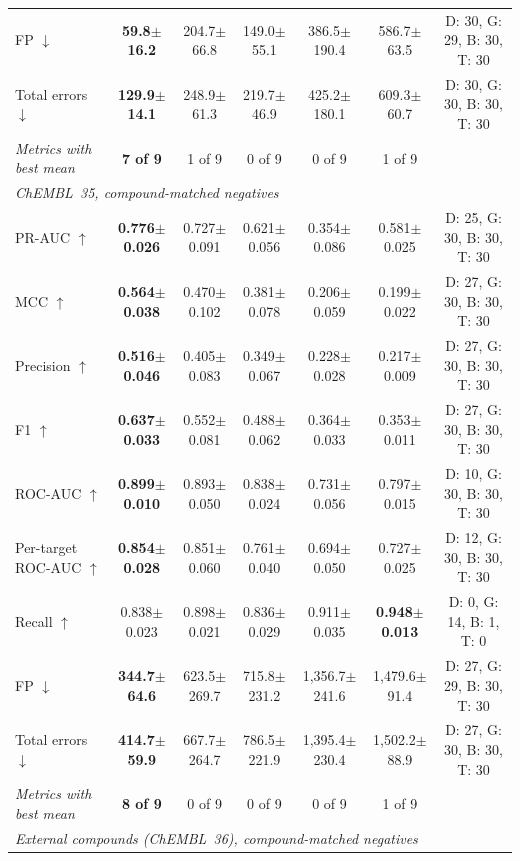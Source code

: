 \documentclass[11pt,letterpaper]{article}
\begin{document}
\begin{table}[!t]
{\begin{tabular}{l c c c c c c}
FP $\downarrow$ & \textbf{59.8$\pm$16.2} & 204.7$\pm$66.8 & 149.0$\pm$55.1 & 386.5$\pm$190.4 & 586.7$\pm$63.5 & D: 30, G: 29, B: 30, T: 30 \\
Total errors $\downarrow$ & \textbf{129.9$\pm$14.1} & 248.9$\pm$61.3 & 219.7$\pm$46.9 & 425.2$\pm$180.1 & 609.3$\pm$60.7 & D: 30, G: 30, B: 30, T: 30 \\
\textit{Metrics with best mean} & \textbf{7 of 9} & 1 of 9 & 0 of 9 & 0 of 9 & 1 of 9 & \\
\midrule
\multicolumn{7}{l}{\textit{ChEMBL~35, compound-matched negatives}} \\
PR-AUC $\uparrow$ & \textbf{0.776$\pm$0.026} & 0.727$\pm$0.091 & 0.621$\pm$0.056 & 0.354$\pm$0.086 & 0.581$\pm$0.025 & D: 25, G: 30, B: 30, T: 30 \\
MCC $\uparrow$ & \textbf{0.564$\pm$0.038} & 0.470$\pm$0.102 & 0.381$\pm$0.078 & 0.206$\pm$0.059 & 0.199$\pm$0.022 & D: 27, G: 30, B: 30, T: 30 \\
Precision $\uparrow$ & \textbf{0.516$\pm$0.046} & 0.405$\pm$0.083 & 0.349$\pm$0.067 & 0.228$\pm$0.028 & 0.217$\pm$0.009 & D: 27, G: 30, B: 30, T: 30 \\
F1 $\uparrow$ & \textbf{0.637$\pm$0.033} & 0.552$\pm$0.081 & 0.488$\pm$0.062 & 0.364$\pm$0.033 & 0.353$\pm$0.011 & D: 27, G: 30, B: 30, T: 30 \\
ROC-AUC $\uparrow$ & \textbf{0.899$\pm$0.010} & 0.893$\pm$0.050 & 0.838$\pm$0.024 & 0.731$\pm$0.056 & 0.797$\pm$0.015 & D: 10, G: 30, B: 30, T: 30 \\
Per-target ROC-AUC $\uparrow$ & \textbf{0.854$\pm$0.028} & 0.851$\pm$0.060 & 0.761$\pm$0.040 & 0.694$\pm$0.050 & 0.727$\pm$0.025 & D: 12, G: 30, B: 30, T: 30 \\
Recall $\uparrow$ & 0.838$\pm$0.023 & 0.898$\pm$0.021 & 0.836$\pm$0.029 & 0.911$\pm$0.035 & \textbf{0.948$\pm$0.013} & D: 0, G: 14, B: 1, T: 0 \\
FP $\downarrow$ & \textbf{344.7$\pm$64.6} & 623.5$\pm$269.7 & 715.8$\pm$231.2 & 1,356.7$\pm$241.6 & 1,479.6$\pm$91.4 & D: 27, G: 29, B: 30, T: 30 \\
Total errors $\downarrow$ & \textbf{414.7$\pm$59.9} & 667.7$\pm$264.7 & 786.5$\pm$221.9 & 1,395.4$\pm$230.4 & 1,502.2$\pm$88.9 & D: 27, G: 30, B: 30, T: 30 \\
\textit{Metrics with best mean} & \textbf{8 of 9} & 0 of 9 & 0 of 9 & 0 of 9 & 1 of 9 & \\
\midrule
\multicolumn{7}{l}{\textit{External compounds (ChEMBL~36), compound-matched negatives}} \\

\end{tabular}}
\end{table}
\end{document}
